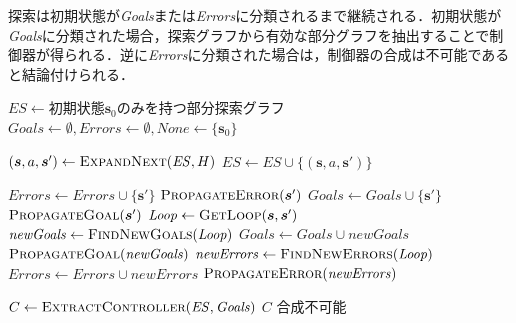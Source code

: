 \documentclass[a4paper,11pt,oneside,openany,report,dvipdfmx]{jsbook}
\begin{document}
探索は初期状態が\textit{Goals}または\textit{Errors}に分類されるまで継続される．初期状態が\textit{Goals}に分類された場合，探索グラフから有効な部分グラフを抽出することで制御器が得られる．逆に\textit{Errors}に分類された場合は，制御器の合成は不可能であると結論付けられる．

\begin{algorithm}
  \caption{On-The-Fly探索によるDirected Controller Synthesis}
  \label{alg:dcs}
  \begin{algorithmic}[1]


    \State $\mathit{ES} \gets$初期状態$\bm{s}_0$のみを持つ部分探索グラフ
    \State $\mathit{Goals} \gets \emptyset, \mathit{Errors} \gets \emptyset, \mathit{None} \gets \{\bm{s}_0\}$

    \Statex

      \State $(\bm{s}, a, \bm{s}') \gets \textsc{ExpandNext}(\mathit{ES}, H)$ 
      \State $\mathit{ES} \gets \mathit{ES} \cup \{(\bm{s}, a, \bm{s}')\}$ 

      \Statex
        \State $\mathit{Errors} \gets \mathit{Errors} \cup \{\bm{s}'\}$
        \State $\textsc{PropagateError}(\bm{s}')$ 
        \State $\mathit{Goals} \gets \mathit{Goals} \cup \{\bm{s}'\}$
        \State $\textsc{PropagateGoal}(\bm{s}')$ 
        \State $\mathit{Loop} \gets \textsc{GetLoop}(\bm{s}, \bm{s}')$
          \State $\mathit{newGoals} \gets \textsc{FindNewGoals}(\mathit{Loop})$
          \State $\mathit{Goals} \gets \mathit{Goals} \cup \mathit{newGoals}$
          \State $\textsc{PropagateGoal}(\mathit{newGoals})$
        \Else
          \State $\mathit{newErrors} \gets \textsc{FindNewErrors}(\mathit{Loop})$
          \State $\mathit{Errors} \gets \mathit{Errors} \cup \mathit{newErrors}$
          \State $\textsc{PropagateError}(\mathit{newErrors})$
        \EndIf
      \EndIf
    \EndWhile

    \Statex

      \State $C \gets \textsc{ExtractController}(\mathit{ES}, \mathit{Goals})$
      \Return $C$
    \Else
      \Return 合成不可能
    \EndIf

    \EndFunction

  \end{algorithmic}
\end{algorithm}
\end{document}
